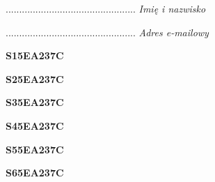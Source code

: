 \begin{turn}{90}\begin{minipage}{\linewidth} \vspace{20mm} ................................................  \textit{Imię i nazwisko}\end{minipage}\end{turn}

\begin{turn}{90}\begin{minipage}{\linewidth} \vspace{20mm} ................................................  \textit{Adres e-mailowy}\end{minipage}\end{turn}

\begin{turn}{90}\huge \begin{minipage}{\linewidth} \vspace{10mm}\textbf{S15EA237C}\end{minipage}\end{turn}

\begin{turn}{90}\huge \begin{minipage}{\linewidth} \vspace{10mm}\textbf{S25EA237C}\end{minipage}\end{turn}

\begin{turn}{90}\huge \begin{minipage}{\linewidth} \vspace{10mm}\textbf{S35EA237C}\end{minipage}\end{turn}

\begin{turn}{90}\huge \begin{minipage}{\linewidth} \vspace{10mm}\textbf{S45EA237C}\end{minipage}\end{turn}

\begin{turn}{90}\huge \begin{minipage}{\linewidth} \vspace{10mm}\textbf{S55EA237C}\end{minipage}\end{turn}

\begin{turn}{90}\huge \begin{minipage}{\linewidth} \vspace{10mm}\textbf{S65EA237C}\end{minipage}\end{turn}

